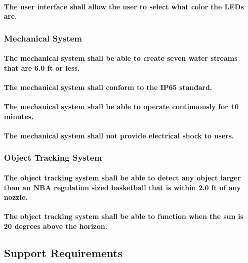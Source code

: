 \paragraph{The user interface shall allow the user to select what color the LEDs are.}

\subsubsection{Mechanical System}
\paragraph{The mechanical system shall be able to create seven water streams that are 6.0 ft or less. }
\paragraph{The mechanical system shall conform to the IP65 standard.   }
\paragraph{The mechanical system shall be able to operate continuously for 10 minutes. }
\paragraph{The mechanical system shall not provide electrical shock to users. }

\subsubsection{Object Tracking System}
\paragraph{The object tracking system shall be able to detect any object larger than an NBA regulation sized basketball that is within 2.0 ft of any nozzle.}
\paragraph{The object tracking system shall be able to function when the sun is 20 degrees above the horizon. }%

\subsection{Support Requirements}

